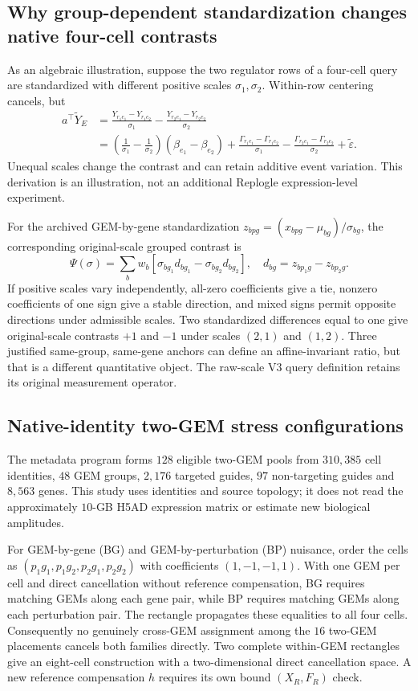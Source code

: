 \subsection{Why group-dependent standardization changes native four-cell contrasts}
As an algebraic illustration, suppose the two regulator rows of a four-cell query are standardized with different positive scales $\sigma_1,\sigma_2$. Within-row centering cancels, but
\begin{align*}
a^\top\widetilde Y_E
&=\frac{Y_{r_1e_1}-Y_{r_1e_2}}{\sigma_1}
-\frac{Y_{r_2e_1}-Y_{r_2e_2}}{\sigma_2}\\
&=\left(\frac1{\sigma_1}-\frac1{\sigma_2}\right)(\beta_{e_1}-\beta_{e_2})
+\frac{\Gamma_{r_1e_1}-\Gamma_{r_1e_2}}{\sigma_1}
-\frac{\Gamma_{r_2e_1}-\Gamma_{r_2e_2}}{\sigma_2}+\widetilde\varepsilon.
\end{align*}
Unequal scales change the contrast and can retain additive event variation. This derivation is an illustration, not an additional Replogle expression-level experiment.

For the archived GEM-by-gene standardization $z_{bpg}=(x_{bpg}-\mu_{bg})/\sigma_{bg}$, the corresponding original-scale grouped contrast is
\[
\Psi(\sigma)=\sum_bw_b[\sigma_{bg_1}d_{bg_1}-\sigma_{bg_2}d_{bg_2}],
\quad d_{bg}=z_{bp_1g}-z_{bp_2g}.
\]
If positive scales vary independently, all-zero coefficients give a tie, nonzero coefficients of one sign give a stable direction, and mixed signs permit opposite directions under admissible scales. Two standardized differences equal to one give original-scale contrasts $+1$ and $-1$ under scales $(2,1)$ and $(1,2)$. Three justified same-group, same-gene anchors can define an affine-invariant ratio, but that is a different quantitative object. The raw-scale V3 query definition retains its original measurement operator.

\subsection{Native-identity two-GEM stress configurations}
The metadata program forms $128$ eligible two-GEM pools from $310{,}385$ cell identities, $48$ GEM groups, $2{,}176$ targeted guides, $97$ non-targeting guides and $8{,}563$ genes. This study uses identities and source topology; it does not read the approximately $10$-GB H5AD expression matrix or estimate new biological amplitudes.

For GEM-by-gene (BG) and GEM-by-perturbation (BP) nuisance, order the cells as $(p_1g_1,p_1g_2,p_2g_1,p_2g_2)$ with coefficients $(1,-1,-1,1)$. With one GEM per cell and direct cancellation without reference compensation, BG requires matching GEMs along each gene pair, while BP requires matching GEMs along each perturbation pair. The rectangle propagates these equalities to all four cells. Consequently no genuinely cross-GEM assignment among the $16$ two-GEM placements cancels both families directly. Two complete within-GEM rectangles give an eight-cell construction with a two-dimensional direct cancellation space. A new reference compensation $h$ requires its own bound $(X_R,F_R)$ check.

